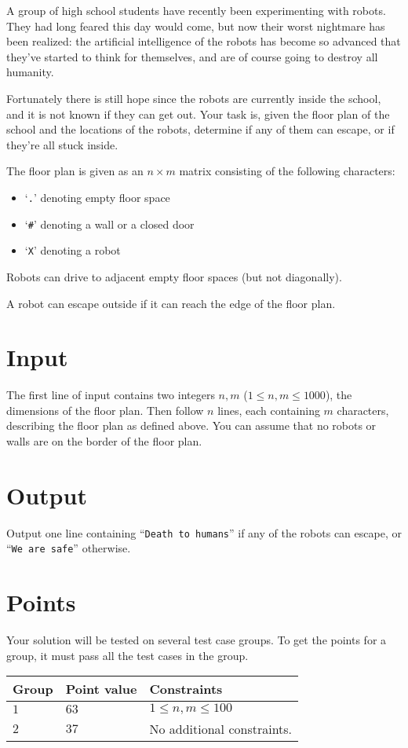 
A group of high school students have recently been experimenting with robots.
They had long feared this day would come, but now their worst nightmare has
been realized: the artificial intelligence of the robots has become so advanced
that they've started to think for themselves, and are of course going to
destroy all humanity.

Fortunately there is still hope since the robots are currently inside the
school, and it is not known if they can get out. Your task is, given the floor
plan of the school and the locations of the robots, determine if any of them
can escape, or if they're all stuck inside.

The floor plan is given as an $n\times m$ matrix consisting of the following characters:

\begin{itemize}
    \item `\texttt{.}' denoting empty floor space
    \item `\texttt{\#}' denoting a wall or a closed door
    \item `\texttt{X}' denoting a robot
\end{itemize}

Robots can drive to adjacent empty floor spaces (but not diagonally).

A robot can escape outside if it can reach the edge of the floor plan.

\section*{Input}
The first line of input contains two integers $n, m$ ($ 1 \leq n,m \leq 1000$),
the dimensions of the floor plan. Then
follow $n$ lines, each containing $m$ characters, describing the floor plan as
defined above. You can assume that no robots or walls are on the border of the
floor plan.

\section*{Output}
Output one line containing ``\texttt{Death to humans}'' if any of the robots
can escape, or ``\texttt{We are safe}'' otherwise.

\section*{Points}
Your solution will be tested on several test case groups.
To get the points for a group, it must pass all the test cases in the group.

\noindent
\begin{tabular}{| l | l | p{12cm} |}
  \hline
  \textbf{Group} & \textbf{Point value} & \textbf{Constraints} \\ \hline
  $1$    & $63$      & $1 \le n, m \le 100$ \\ \hline
  $2$    & $37$      & No additional constraints. \\ \hline
\end{tabular}

